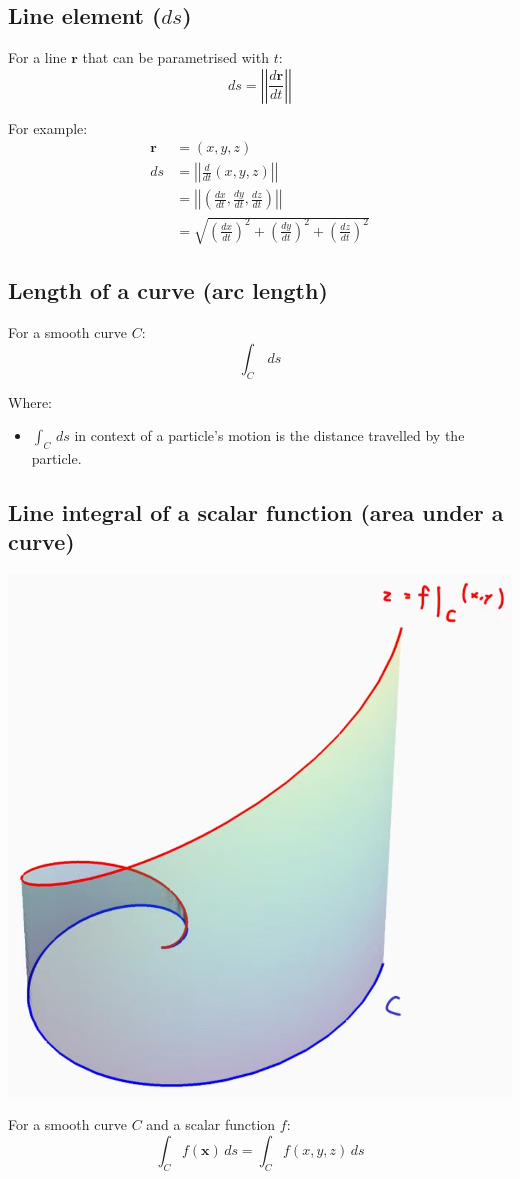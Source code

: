 \documentclass[11pt]{article}
\begin{document}
\subsection{Line element (\(ds\))}
\label{sec:orgdc991cf}
For a line \(\boldsymbol{r}\) that can be parametrised with \(t\):
\[ds = \left| \left| \frac{d \boldsymbol{r}}{dt} \right| \right|\]

For example:
\begin{align*}
\boldsymbol{r} &= (x, y, z) \\
ds &= \left| \left| \frac{d}{dt} (x, y, z) \right| \right| \\
&= \left| \left| \left(\frac{dx}{dt}, \frac{dy}{dt}, \frac{dz}{dt} \right) \right| \right| \\
&= \sqrt{\left(\frac{dx}{dt} \right)^2 + \left(\frac{dy}{dt} \right)^2 + \left(\frac{dz}{dt} \right)^2}
\end{align*}
\subsection{Length of a curve (arc length)}
\label{sec:org191753e}
For a smooth curve \(C\):
\[\int_C \, ds\]

Where:
\begin{itemize}
\item \(\int_C \, ds\) in context of a particle's motion is the distance travelled by the particle.
\end{itemize}
\subsection{Line integral of a scalar function (area under a curve)}
\label{sec:org8ee3fd5}
\begin{center}
\includegraphics[width=.9\linewidth]{./images/line-integral-of-a-scalar-function.png}
\end{center}
For a smooth curve \(C\) and a scalar function \(f\):
\[\int_C f(\boldsymbol{x}) \, ds = \int_C f(x, y, z) \, ds\]
\end{document}
